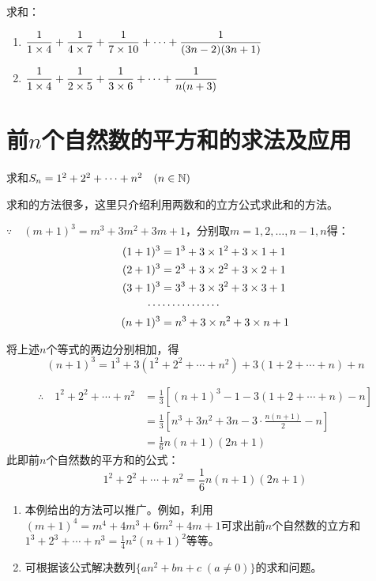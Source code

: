 \begin{ex}
求和：
\begin{enumerate}
    \item $\dfrac{1}{1\times 4}+\dfrac{1}{4\times 7}+\dfrac{1}{7\times 10}+\cdots +\dfrac{1}{(3n-2)(3n+1)}$
    \item $\dfrac{1}{1\times 4}+\dfrac{1}{2\times 5}+\dfrac{1}{3\times 6}+\cdots +\dfrac{1}{n(n+3)}$
\end{enumerate}
\end{ex}

\section{前$n$个自然数的平方和的求法及应用}

\begin{example}
    求和$S_n=1^2+2^2+\cdots +n^2\quad (n\in\mathbb{N})$
\end{example}

\begin{analyze}
    求和的方法很多，这里只介绍利用两数和的立方公式求此和的方法。
\end{analyze}

\begin{solution}
$\because\quad (m+1)^3=m^3+3m^2+3m+1$，分别取$m=1,2,\ldots,n-1,n$得：
\[\begin{split}
    (1+1)^3&=1^3+3\times 1^2+3\times 1+1\\
    (2+1)^3&=2^3+3\times 2^2+3\times 2+1\\
    (3+1)^3&=3^3+3\times 3^2+3\times 3+1\\
    \cdots&\cdots\cdots\cdots\cdots\\
    (n+1)^3&=n^3+3\times n^2+3\times n+1\\
\end{split}\]

将上述$n$个等式的两边分别相加，得
\[(n+1)^3=1^3+3(1^2+2^2+\cdots+n^2)+3(1+2+\cdots +n)+n\]

\[\begin{split}
\therefore\quad  1^2+2^2+\cdots +n^2 &=\frac{1}{3}\left[(n+1)^3-1-3(1+2+\cdots +n)-n\right]\\
&=\frac{1}{3}\left[n^3+3n^2+3n-3\cdot \frac{n(n+1)}{2}-n\right]\\
&=\frac{1}{6}n(n+1)(2n+1) 
\end{split}\]
此即前$n$个自然数的平方和的公式：
\[1^2+2^2+\cdots +n^2=\frac{1}{6}n(n+1)(2n+1)  \]
\end{solution}

\begin{rmk}
\begin{enumerate}
    \item 本例给出的方法可以推广。例如，利用$(m+1)^4=m^4+4m^3+6m^2+4m+1$可求出前$n$个自然数的立方和$1^3+2^3+\cdots +n^3=\frac{1}{4}n^2(n+1)^2$等等。
    \item 可根据该公式解决数列$\{an^2+bn+c\; (a\ne 0)\}$的求和问题。
\end{enumerate}
\end{rmk}

